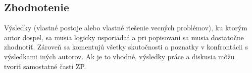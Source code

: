 \subsection{Zhodnotenie}
Výsledky (vlastné postoje alebo vlastné riešenie vecných problémov), ku ktorým autor dospel, sa musia logicky usporiadať a pri popisovaní sa musia dostatočne zhodnotiť. Zároveň sa komentujú všetky skutočnosti a poznatky v konfrontácii s výsledkami iných autorov. Ak je to vhodné, výsledky práce a diskusia môžu tvoriť samostatné časti ZP.





